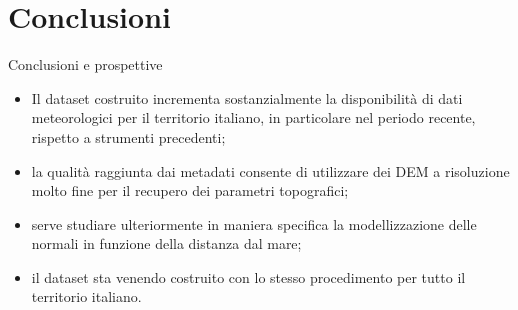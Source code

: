 
\section{Conclusioni}
\begin{frame}{Conclusioni e prospettive}
  \begin{itemize}
    \item Il dataset costruito incrementa sostanzialmente la disponibilità di dati meteorologici per il territorio italiano, in particolare nel periodo recente, rispetto a strumenti precedenti;
    \item la qualità raggiunta dai metadati consente di utilizzare dei DEM a risoluzione molto fine per il recupero dei parametri topografici;
    \item serve studiare ulteriormente in maniera specifica la modellizzazione delle normali in funzione della distanza dal mare;
    \item il dataset sta venendo costruito con lo stesso procedimento per tutto il territorio italiano.
  \end{itemize}
\end{frame}

